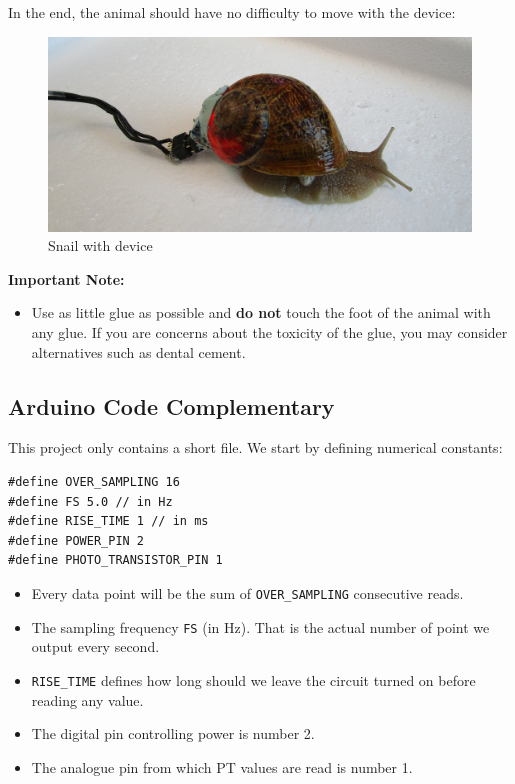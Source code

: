 \documentclass[]{article}
\begin{document}
In the end, the animal should have no difficulty to move with the
device:

\begin{figure}[htbp]
\centering
\includegraphics{./img/snail_with_device.jpg}
\caption{Snail with device}
\end{figure}

\textbf{Important Note:}

\begin{itemize}
\itemsep1pt\parskip0pt
\item
  Use as little glue as possible and \textbf{do not} touch the foot of
  the animal with any glue. If you are concerns about the toxicity of
  the glue, you may consider alternatives such as dental cement.
\end{itemize}

\subsection{Arduino Code
Complementary}\label{arduino-code-complementary}

This project only contains a short file. We start by defining numerical
constants:

\begin{verbatim}
#define OVER_SAMPLING 16
#define FS 5.0 // in Hz
#define RISE_TIME 1 // in ms
#define POWER_PIN 2
#define PHOTO_TRANSISTOR_PIN 1
\end{verbatim}

\begin{itemize}
\itemsep1pt\parskip0pt
\item
  Every data point will be the sum of \texttt{OVER\_SAMPLING}
  consecutive reads.
\item
  The sampling frequency \texttt{FS} (in Hz). That is the actual number
  of point we output every second.
\item
  \texttt{RISE\_TIME} defines how long should we leave the circuit
  turned on before reading any value.
\item
  The digital pin controlling power is number 2.
\item
  The analogue pin from which PT values are read is number 1.
\end{itemize}
\end{document}
